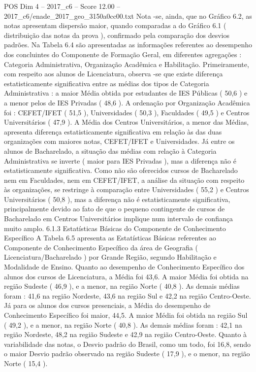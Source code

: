\begin{textsample}{POS Dim 4 – 2017\_c6 – Score 12.00 – 2017\_c6/enade\_2017\_geo\_3150a0cc00.txt}
Nota -se, ainda, que no Gráfico 6.2, as notas apresentam dispersão maior, quando comparadas a do Gráfico 6.1 ( distribuição das notas da prova ), confirmado pela comparação dos desvios padrões.
Na Tabela 6.4 são apresentadas as informações referentes ao desempenho dos concluintes do Componente de Formação Geral, em diferentes agregações : Categoria Administrativa, Organização Acadêmica e Habilitação.
Primeiramente, com respeito aos alunos de Licenciatura, observa -se que existe diferença estatisticamente significativa entre as médias dos tipos de Categoria Administrativa : a maior Média obtida por estudantes de IES Públicas ( 50,6 ) e a menor pelos de IES Privadas ( 48,6 ).
A ordenação por Organização Acadêmica foi : CEFET/IFET ( 51,5 ), Universidades ( 50,3 ), Faculdades ( 49,5 ) e Centros Universitários ( 47,9 ).
A Média dos Centros Universitários, a menor das Médias, apresenta diferença estatisticamente significativa em relação às das duas organizações com maiores notas, CEFET/IFET e Universidades.
Já entre os alunos de Bacharelado, a situação das médias com relação à Categoria Administrativa se inverte ( maior para IES Privadas ), mas a diferença não é estatisticamente significativa.
Como não são oferecidos cursos de Bacharelado nem em Faculdades, nem em CEFET/IFET, a análise da situação com respeito às organizações, se restringe à comparação entre Universidades ( 55,2 ) e Centros Universitários ( 50,8 ), mas a diferença não é estatisticamente significativa, principalmente devido ao fato de que o pequeno contingente de cursos de Bacharelado em Centros Universitários implique num intervalo de confiança muito amplo. 6.1.3 Estatísticas Básicas do Componente de Conhecimento Específico A Tabela 6.5 apresenta as Estatísticas Básicas referentes ao Componente de Conhecimento Específico da área de Geografia ( Licenciatura/Bacharelado ) por Grande Região, segundo Habilitação e Modalidade de Ensino.
Quanto ao desempenho de Conhecimento Específico dos alunos dos cursos de Licenciatura, a Média foi 43,6.
A maior Média foi obtida na região Sudeste ( 46,9 ), e a menor, na região Norte ( 40,8 ).
As demais médias foram : 41,6 na região Nordeste, 43,6 na região Sul e 42,2 na região Centro-Oeste.
Já para os alunos dos cursos presenciais, a Média do desempenho de Conhecimento Específico foi maior, 44,5.
A maior Média foi obtida na região Sul ( 49,2 ), e a menor, na região Norte ( 40,8 ).
As demais médias foram : 42,1 na região Nordeste, 48,2 na região Sudeste e 42,9 na região Centro-Oeste.
Quanto à variabilidade das notas, o Desvio padrão do Brasil, como um todo, foi 16,8, sendo o maior Desvio padrão observado na região Sudeste ( 17,9 ), e o menor, na região Norte ( 15,4 ).

\end{textsample}

